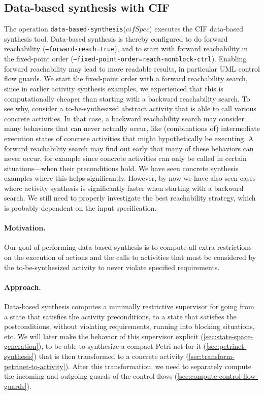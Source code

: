 \documentclass{article}
\newcommand{\keyw}[1]{\texttt{#1}}
\newcommand{\var}[1]{\ensuremath{\mathit{#1}}}
\newcommand{\dataBasedSynthesisLabel}[0]{\keyw{data-based-synthesis}}
\newcommand{\dataBasedSynthesis}[1]{\dataBasedSynthesisLabel(\ensuremath{#1})}
\theoremstyle{definition}
\begin{document}

\subsection{Data-based synthesis with CIF}
\label{sec:data-based-synthesis}

The operation \dataBasedSynthesis{\var{cifSpec}} executes the CIF data-based synthesis tool.
Data-based synthesis is thereby configured to do forward reachability (\texttt{--forward-reach=true}), and to start with forward reachability in the fixed-point order (\texttt{--fixed-point-order=reach-nonblock-ctrl}).
Enabling forward reachability may lead to more readable results, in particular UML control flow guards.
We start the fixed-point order with a forward reachability search, since in earlier activity synthesis examples, we experienced that this is computationally cheaper than starting with a backward reachability search.
To see why, consider a to-be-synthesized abstract activity that is able to call various concrete activities.
In that case, a backward reachability search may consider many behaviors that can never actually occur, like (combinations of) intermediate execution states of concrete activities that might hypothetically be executing.
A forward reachability search may find out early that many of these behaviors can never occur, for example since concrete activities can only be called in certain situations---when their preconditions hold.
We have seen concrete synthesis examples where this helps significantly.
However, by now we have also seen cases where activity synthesis is significantly faster when starting with a backward search.
We still need to properly investigate the best reachability strategy, which is probably dependent on the input specification.

\paragraph{Motivation.}
Our goal of performing data-based synthesis is to compute all extra restrictions on the execution of actions and the calls to activities that must be considered by the to-be-synthesized activity to never violate specified requirements.

\paragraph{Approach.}
Data-based synthesis computes a minimally restrictive supervisor for going from a state that satisfies the activity preconditions, to a state that satisfies the postconditions, without violating requirements, running into blocking situations, etc.
We will later make the behavior of this supervisor explicit (\autoref{sec:state-space-generation}), to be able to synthesize a compact Petri net for it (\autoref{sec:petrinet-synthesis}) that is then transformed to a concrete activity (\autoref{sec:transform-petrinet-to-activity}).
After this transformation, we need to separately compute the incoming and outgoing guards of the control flows (\autoref{sec:compute-control-flow-guards}).
\end{document}
